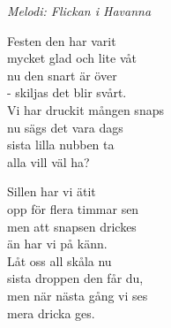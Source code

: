 {\footnotesize\textit{Melodi: Flickan i Havanna}}\par
\vspace{10pt}
Festen den har varit\\
mycket glad och lite våt\\
nu den snart är över\\
- skiljas det blir svårt.\\
Vi har druckit mången snaps\\
nu sägs det vara dags\\
sista lilla nubben ta\\
alla vill väl ha?\par
\vspace{10pt}
Sillen har vi ätit\\
opp för flera timmar sen\\
men att snapsen drickes\\
än har vi på känn.\\
Låt oss all skåla nu\\
sista droppen den får du,\\
men när nästa gång vi ses\\
mera dricka ges.
